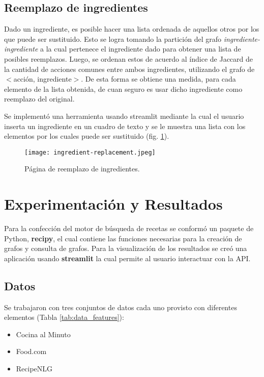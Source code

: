 \documentclass[
	a4paper, %
	10pt, %
	unnumberedsections, %
	twoside, %
]{LTJournalArticle}
\begin{document}
\subsection{Reemplazo de ingredientes}

Dado un ingrediente, es posible hacer una lista ordenada de aquellos otros por los que puede ser sustituido. Esto se logra tomando la partición del grafo \emph{ingrediente-ingrediente} a la cual pertenece el ingrediente dado para obtener una lista de posibles reemplazos. Luego, se ordenan estos de acuerdo al índice de Jaccard de la cantidad de acciones comunes entre ambos ingredientes, utilizando el grafo de $<$acción, ingrediente$>$. De esta forma se obtiene una medida, para cada elemento de la lista obtenida, de cuan seguro es usar dicho ingrediente como reemplazo del original. 

Se implementó una herramienta usando streamlit mediante la cual el usuario inserta un ingrediente en un cuadro de texto y se le muestra una lista con los elementos por los cuales puede ser sustituido (fig. \ref{fig:ingredient-replacement}).

\begin{figure}
	\texttt{[image: ingredient-replacement.jpeg]}
	\caption{Página de reemplazo de ingredientes.}
	\label{fig:ingredient-replacement}
\end{figure}


\section{Experimentación y Resultados}

Para la confección del motor de búsqueda de recetas se conformó un paquete de Python, \textbf{recipy}, el cual
contiene las funciones necesarias para la creación de grafos y consulta de grafos. Para la visualización de los
resultados se creó una aplicación usando \textbf{streamlit} la cual permite al usuario interactuar con la API.

\subsection{Datos}

Se trabajaron con tres conjuntos de datos cada uno provisto con diferentes elementos (Tabla \ref{tab:data_features}):

\begin{itemize}
	\item Cocina al Minuto
	\item Food.com \autocite{majumder2019generating}
	\item RecipeNLG \autocite{bien-etal-2020-recipenlg}
\end{itemize}
\end{document}
